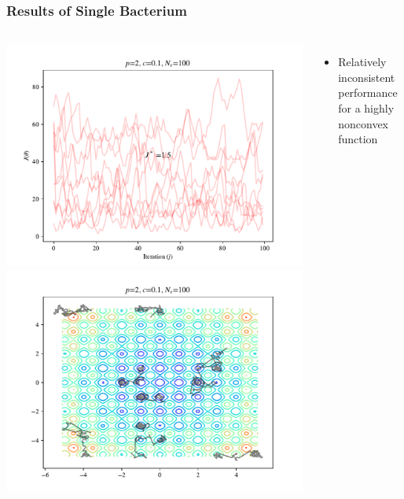 \documentclass{beamer}
\begin{document}
\begin{frame}
\frametitle{Results of Single Bacterium}
\begin{columns}[T]
    \begin{center}
      \includegraphics[scale=0.3]{assets/rastrigin_J}
      \includegraphics[scale=0.3]{assets/rastrigin_theta}
    \end{center}
    \begin{itemize}
      \item Relatively inconsistent performance for a highly nonconvex function
    \end{itemize}
\end{columns}
\end{frame}
\end{document}
